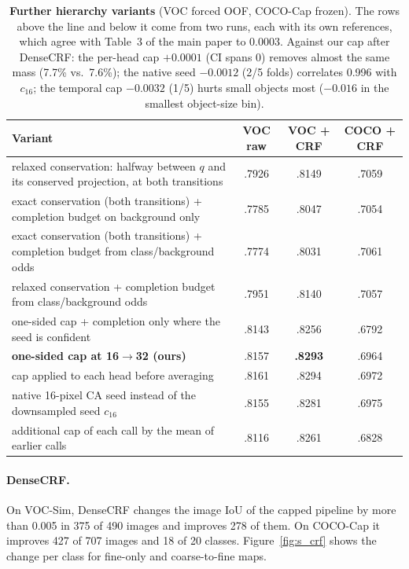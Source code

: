 \documentclass[10pt,twocolumn,letterpaper]{article}
\begin{document}
\begin{table}[t]
\centering
\footnotesize\setlength{\tabcolsep}{4pt}
\begin{tabular}{@{}lccc@{}}
\toprule
Variant & VOC raw & VOC + CRF & COCO + CRF \\
\midrule
relaxed conservation: halfway between $q$ and its conserved projection, at both transitions & .7926 & .8149 & .7059 \\
exact conservation (both transitions) + completion budget on background only & .7785 & .8047 & .7054 \\
exact conservation (both transitions) + completion budget from class/background odds & .7774 & .8031 & .7061 \\
relaxed conservation + completion budget from class/background odds & .7951 & .8140 & .7057 \\
one-sided cap + completion only where the seed is confident & .8143 & .8256 & .6792 \\
\midrule
\textbf{one-sided cap at 16$\rightarrow$32 (ours)} & .8157 & \textbf{.8293} & .6964 \\
cap applied to each head before averaging & .8161 & .8294 & .6972 \\
native 16-pixel CA seed instead of the downsampled seed $c_{16}$ & .8155 & .8281 & .6975 \\
additional cap of each call by the mean of earlier calls & .8116 & .8261 & .6828 \\
\bottomrule
\end{tabular}
\caption{\textbf{Further hierarchy variants} (VOC forced OOF, COCO-Cap frozen). The rows above the line and below it come from two runs, each with its own references, which agree with Table~3 of the main paper to 0.0003. Against our cap after DenseCRF: the per-head cap $+0.0001$ (CI spans 0) removes almost the same mass (7.7\% vs.\ 7.6\%); the native seed $-0.0012$ (2/5 folds) correlates 0.996 with $c_{16}$; the temporal cap $-0.0032$ (1/5) hurts small objects most ($-0.016$ in the smallest object-size bin).}
\label{tab:s_hier}
\end{table}

\paragraph{DenseCRF.}
On VOC-Sim, DenseCRF changes the image IoU of the capped pipeline by more than 0.005 in 375 of 490 images and improves 278 of them. On COCO-Cap it improves 427 of 707 images and 18 of 20 classes. Figure~\ref{fig:s_crf} shows the change per class for fine-only and coarse-to-fine maps.
\end{document}
